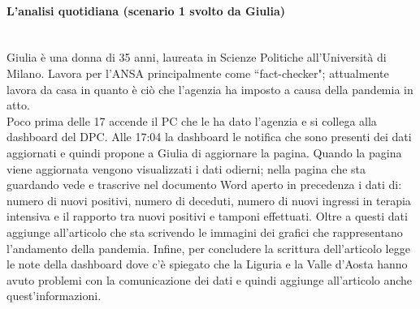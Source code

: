 \paragraph{L'analisi quotidiana (scenario 1 svolto da Giulia)}\mbox{}\\
Giulia è una donna di 35 anni, laureata in Scienze Politiche all'Università di Milano.
Lavora per l'ANSA principalmente come ``fact-checker"; attualmente lavora da casa in quanto è ciò che l'agenzia ha imposto a causa della pandemia in atto.\\
Poco prima delle 17 accende il PC che le ha dato l'agenzia e si collega alla dashboard del DPC.
Alle 17:04 la dashboard le notifica che sono presenti dei dati aggiornati e quindi propone a Giulia di aggiornare la pagina.
Quando la pagina viene aggiornata vengono visualizzati i dati odierni; nella pagina che sta guardando vede e trascrive nel documento Word aperto in precedenza i dati di: numero di nuovi positivi, numero di deceduti, numero di nuovi ingressi in terapia intensiva e il rapporto tra nuovi positivi e tamponi effettuati.
Oltre a questi dati aggiunge all'articolo che sta scrivendo le immagini dei grafici che rappresentano l'andamento della pandemia.
Infine, per concludere la scrittura dell'articolo legge le note della dashboard dove c'è spiegato che la Liguria e la Valle d'Aosta hanno avuto problemi con la comunicazione dei dati e quindi aggiunge all'articolo anche quest'informazioni.
\noindent
